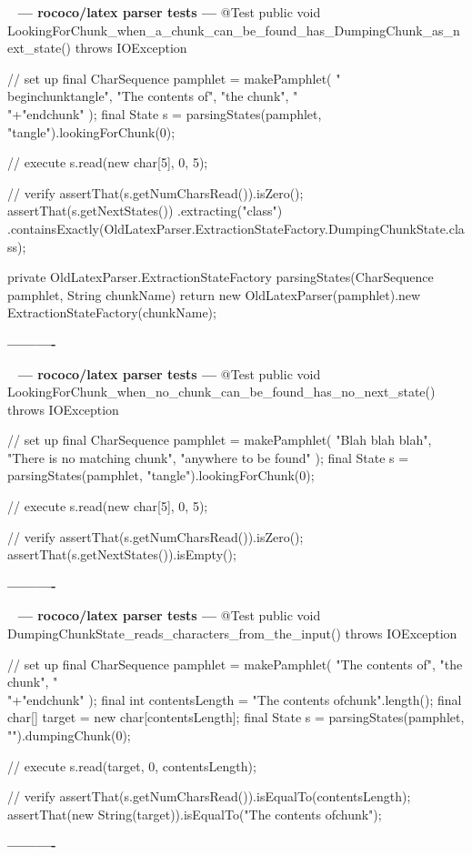 \documentclass{book}
\newenvironment{chunk}[1]{%
{\ }\newline\noindent%
\hbox{\hskip 2.0cm}{\bf --- #1 ---}%
\verbatim}%                               say exactly what we see
{\endverbatim%
\par{}%
\noindent{}%
\hbox{\hskip 2.0cm}{\bf ----------}%
\par%
\normalsize\noindent}%
\begin{document}
\begin{chunk}{rococo/latex parser tests}
@Test
public void LookingForChunk_when_a_chunk_can_be_found_has_DumpingChunk_as_next_state() throws IOException {
    // set up
    final CharSequence pamphlet = makePamphlet(
            "\\begin{chunk}{tangle}",
            "The contents of",
            "the chunk",
            "\\"+"end{chunk}"
    );
    final State s = parsingStates(pamphlet, "tangle").lookingForChunk(0);

    // execute
    s.read(new char[5], 0, 5);

    // verify
    assertThat(s.getNumCharsRead()).isZero();
    assertThat(s.getNextStates())
            .extracting("class")
            .containsExactly(OldLatexParser.ExtractionStateFactory.DumpingChunkState.class);
}

private OldLatexParser.ExtractionStateFactory parsingStates(CharSequence pamphlet, String chunkName) {
    return new OldLatexParser(pamphlet).new ExtractionStateFactory(chunkName);
}
\end{chunk}

\begin{chunk}{rococo/latex parser tests}
@Test
public void LookingForChunk_when_no_chunk_can_be_found_has_no_next_state() throws IOException {
    // set up
    final CharSequence pamphlet = makePamphlet(
            "Blah blah blah",
            "There is no matching chunk",
            "anywhere to be found"
    );
    final State s = parsingStates(pamphlet, "tangle").lookingForChunk(0);

    // execute
    s.read(new char[5], 0, 5);

    // verify
    assertThat(s.getNumCharsRead()).isZero();
    assertThat(s.getNextStates()).isEmpty();
}
\end{chunk}

\begin{chunk}{rococo/latex parser tests}
@Test
public void DumpingChunkState_reads_characters_from_the_input() throws IOException {
    // set up
    final CharSequence pamphlet = makePamphlet(
            "The contents of",
            "the chunk",
            "\\"+"end{chunk}"
    );
    final int contentsLength = "The contents of\nthe chunk\n".length();
    final char[] target = new char[contentsLength];
    final State s = parsingStates(pamphlet, "").dumpingChunk(0);

    // execute
    s.read(target, 0, contentsLength);

    // verify
    assertThat(s.getNumCharsRead()).isEqualTo(contentsLength);
    assertThat(new String(target)).isEqualTo("The contents of\nthe chunk\n");
}
\end{chunk}
\end{document}
